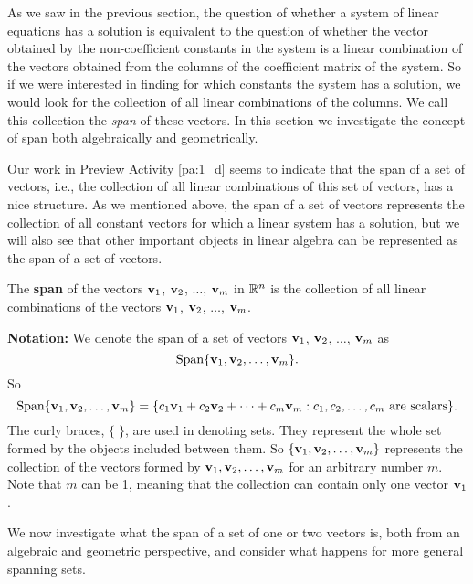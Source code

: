 As we saw in the previous section, the question of whether a system of linear equations has a solution is equivalent to the question of whether the vector obtained by the non-coefficient constants in the system is a linear combination of the vectors obtained from the columns of the coefficient matrix of the system. So if we were interested in finding for which constants the system has a solution, we would look for the collection of all linear combinations of the columns. We call this collection the \emph{span} of these vectors. In this section we investigate the concept of span both algebraically and geometrically.

Our work in Preview Activity \ref{pa:1_d} seems to indicate that the span of a set of vectors, i.e., the collection of all linear combinations of this set of vectors, has a nice structure. As we mentioned above, the span of a set of vectors represents the collection of all constant vectors for which a linear system has a solution, but we will also see that other important objects in linear algebra can be represented as the span of a set of vectors.



\begin{definition} \label{def:1_d_span}  The \textbf{span} of the vectors $\mathbf{v}_1$, $\mathbf{v}_2$, $\ldots$, $\mathbf{v}_m$ in $\mathbb{R}^n$ is the collection of all  linear combinations of the vectors $\mathbf{v}_1$, $\mathbf{v}_2$, $\ldots$, $\mathbf{v}_m$.
\end{definition}



\noindent \textbf{Notation:} We denote the span of a set of vectors $\mathbf{v}_1$, $\mathbf{v}_2$, $\ldots$, $\mathbf{v}_m$ as
\[\text{Span} \{\mathbf{v}_1, \mathbf{v}_2, \ldots, \mathbf{v}_m\} .\]
So
\[\text{Span} \{\mathbf{v}_1, \mathbf{v}_2, \ldots, \mathbf{v}_m\}  = \{c_1\mathbf{v}_1+c_2\mathbf{v}_2 + \cdots + c_m \mathbf{v}_m : c_1, c_2, \ldots, c_m \text{ are scalars}\}.\]
The curly braces, $\{ \; \}$, are used in denoting sets. They represent the whole set formed by the objects included between them. So $\{\mathbf{v}_1, \mathbf{v}_2, \ldots, \mathbf{v}_m\}$ represents the collection of the vectors formed by $\mathbf{v}_1, \mathbf{v}_2, \ldots, \mathbf{v}_m$ for an arbitrary number $m$. Note that $m$ can be 1, meaning that the collection can contain only one vector $\mathbf{v}_1$.



We now investigate what the span of a set of one or two vectors is, both from an algebraic and geometric perspective, and consider what happens for more general spanning sets.

